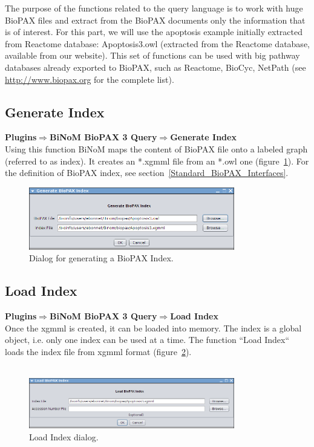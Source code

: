 The purpose of the functions related to the query language is to work with huge
BioPAX files and extract from the BioPAX documents only the information that is
of interest. For this part, we will use the apoptosis example initially
extracted from Reactome database: Apoptosis3.owl (extracted from the Reactome
database, available from our website). This set of functions can be used with
big pathway databases already exported to BioPAX, such as Reactome, BioCyc,
NetPath (see \url{http://www.biopax.org} for the complete list).

\subsection{Generate Index}
\textbf{Plugins$\Rightarrow$BiNoM BioPAX 3 Query$\Rightarrow$Generate Index}\\

Using this function BiNoM maps the content of BioPAX file onto a labeled graph
(referred to as index). It creates an *.xgmml file from an *.owl one
(figure~\ref{Generate_BioPAX_Index}). For the definition of BioPAX index, see
section~\ref{Standard_BioPAX_Interfaces}.

\begin{figure}
\centering
\includegraphics[width=0.8\textwidth]{graphics/ebo_generate_BioPAX_Index}
\caption{Dialog for generating a BioPAX Index.}
\label{Generate_BioPAX_Index}
\end{figure}

\subsection{Load Index}
\textbf{Plugins$\Rightarrow$BiNoM BioPAX 3 Query$\Rightarrow$Load Index}\\

Once the xgmml is created, it can be loaded into memory. The index is a global
object, i.e. only one index can be used at a time. The function ``Load Index`` loads the index
file from xgmml format (figure~\ref{Load_Index_Dialog}).\\\\

\begin{figure}
\centering
\includegraphics[width=0.8\textwidth]{graphics/ebo_load_BioPAX_Index}
\caption{Load Index dialog.}
\label{Load_Index_Dialog}
\end{figure}

